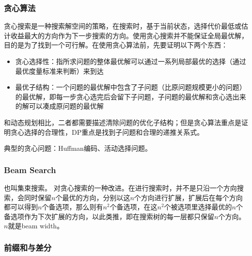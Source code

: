 \subsubsection{贪心算法}
贪心搜索是一种搜索解空间的策略，在搜索时，基于当前状态，选择代价最低或估计收益最大的方向作为下一步搜索的方向。使用贪心搜索并不能保证全局最优解，目的是为了找到一个可行解。在使用贪心算法前，先要证明以下两个东西：
\begin{itemize}
	\item 贪心选择性：指所求问题的整体最优解可以通过一系列局部最优的选择（通过最优度量标准来判断）来到达
	\item 最优子结构：一个问题的最优解中包含了子问题（比原问题规模更小的问题）的最优解，即每一步贪心选完后会留下子问题，子问题的最优解和贪心选出来的解可以凑成原问题的最优解
\end{itemize}
和动态规划相比，二者都需要描述清除问题的优化子结构；但是贪心算法重点是证明贪心选择的合理性，DP重点是找到子问题和合理的递推关系式。

典型的贪心问题：Huffman编码、活动选择问题。



\subsubsection{Beam Search}
也叫集束搜索。
对贪心搜索的一种改进。在进行搜索时，并不是只沿一个方向搜索，会同时保留$n$个最优的方向，分别以这$n$个方向进行扩展，扩展后在每个方向都可以得到$n$个备选项，那么则有$n^2$个备选项，在这$n^2$个被选项里选择最优的$n$个备选项作为下次扩展的方向，以此类推，即在搜索树的每一层都只保留$n$个方向。$n$就是beam width。

\subsubsection{前缀和与差分}
